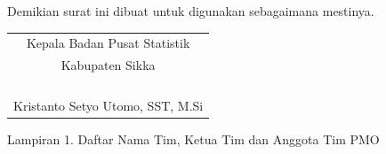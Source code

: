 \documentclass{article}
\begin{document}
Demikian surat ini dibuat untuk digunakan sebagaimana mestinya.

\bigskip
\hfill
\begin{tabular}{@{}c}
Kepala Badan Pusat Statistik\\
Kabupaten Sikka \bigskip\\
\\
\\
\\
\\
Kristanto Setyo Utomo, SST, M.Si
\end{tabular}



\newpage

Lampiran 1. Daftar Nama Tim, Ketua Tim dan Anggota Tim PMO

\end{document}
